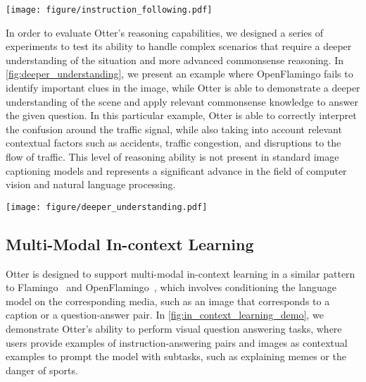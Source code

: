 \documentclass{article}
\begin{document}
\begin{figure*}[htp]
    \centering
\texttt{[image: figure/instruction\_following.pdf]}
\caption{\textbf{Comparisons of image captioning results between OpenFlamingo and Otter.} Otter provides more detailed and precise descriptions of the images.}
    \label{fig:instruction_following}
\end{figure*}

In order to evaluate Otter's reasoning capabilities, we designed a series of experiments to test its ability to handle complex scenarios that require a deeper understanding of the situation and more advanced commonsense reasoning. In \cref{fig:deeper_understanding}, we present an example where OpenFlamingo fails to identify important clues in the image, while Otter is able to demonstrate a deeper understanding of the scene and apply relevant commonsense knowledge to answer the given question. In this particular example, Otter is able to correctly interpret the confusion around the traffic signal, while also taking into account relevant contextual factors such as accidents, traffic congestion, and disruptions to the flow of traffic. This level of reasoning ability is not present in standard image captioning models and represents a significant advance in the field of computer vision and natural language processing.

\begin{figure*}[htp]
    \centering
\texttt{[image: figure/deeper\_understanding.pdf]}
\caption{\textbf{Comparisons of situation understanding results between OpenFlamingo and Otter.} Otter is able to demonstrate a deeper understanding of the scene and apply relevant commonsense knowledge to answer the given question.}
    \label{fig:deeper_understanding}
\end{figure*}

\subsection{Multi-Modal In-context Learning}
\label{sec:in_context_learning}

Otter is designed to support multi-modal in-context learning in a similar pattern to Flamingo~\cite{flamingo} and OpenFlamingo~\cite{open_flamingo}, which involves conditioning the language model on the corresponding media, such as an image that corresponds to a caption or a question-answer pair. In \cref{fig:in_context_learning_demo}, we demonstrate Otter's ability to perform visual question answering tasks, where users provide examples of instruction-answering pairs and images as contextual examples to prompt the model with subtasks, such as explaining memes or the danger of sports.
\end{document}
